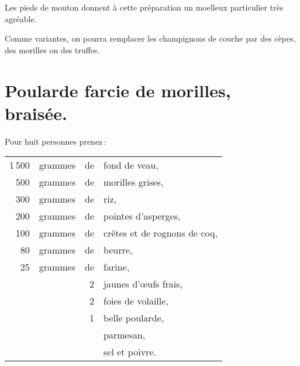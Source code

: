 Les pieds de mouton donnent à cette préparation un moelleux particulier très
agréable.

\sk

Comme variantes, on pourra remplacer les champignons de couche par des cèpes,
des morilles on des truffes.

\section*{\centering Poularde farcie de morilles, braisée.}
{}

Pour huit personnes prenez :

\medskip

\footnotesize
\begin{longtable}{rrrp{16em}}
  1 500 & grammes & de & fond de veau,                                                                    \\
    500 & grammes & de & morilles grises,                                                                 \\
    300 & grammes & de & riz,                                                                             \\
    200 & grammes & de & pointes d'asperges,                                                              \\
    100 & grammes & de & crêtes et de rognons de coq,                                                     \\
     80 & grammes & de & beurre,                                                                          \\
     25 & grammes & de & farine,                                                                          \\
        &         &  2 & jaunes d'œufs frais,                                                             \\
        &         &  2 & foies de volaille,                                                               \\
        &         &  1 & belle poularde,                                                                  \\
        &         &    & parmesan,                                                                        \\
        &         &    & sel et poivre.                                                                   \\
\end{longtable}
\normalsize

